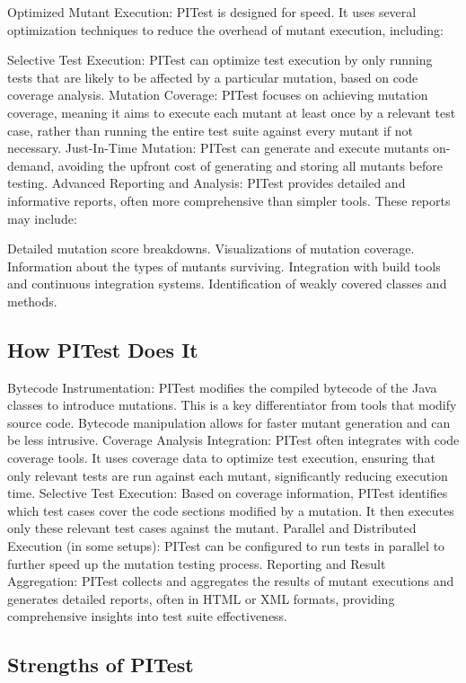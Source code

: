 \documentclass[sigplan, nonacm]{acmart}
\begin{document}
Optimized Mutant Execution: PITest is designed for speed. It uses several optimization techniques to reduce the overhead of mutant execution, including:

Selective Test Execution: PITest can optimize test execution by only running tests that are likely to be affected by a particular mutation, based on code coverage analysis.
Mutation Coverage: PITest focuses on achieving mutation coverage, meaning it aims to execute each mutant at least once by a relevant test case, rather than running the entire test suite against every mutant if not necessary.
Just-In-Time Mutation: PITest can generate and execute mutants on-demand, avoiding the upfront cost of generating and storing all mutants before testing.
Advanced Reporting and Analysis: PITest provides detailed and informative reports, often more comprehensive than simpler tools. These reports may include:

Detailed mutation score breakdowns.
Visualizations of mutation coverage.
Information about the types of mutants surviving.
Integration with build tools and continuous integration systems.
Identification of weakly covered classes and methods.
\subsection{How PITest Does It}

Bytecode Instrumentation: PITest modifies the compiled bytecode of the Java classes to introduce mutations. This is a key differentiator from tools that modify source code. Bytecode manipulation allows for faster mutant generation and can be less intrusive.
Coverage Analysis Integration: PITest often integrates with code coverage tools. It uses coverage data to optimize test execution, ensuring that only relevant tests are run against each mutant, significantly reducing execution time.
Selective Test Execution: Based on coverage information, PITest identifies which test cases cover the code sections modified by a mutation. It then executes only these relevant test cases against the mutant.
Parallel and Distributed Execution (in some setups): PITest can be configured to run tests in parallel to further speed up the mutation testing process.
Reporting and Result Aggregation: PITest collects and aggregates the results of mutant executions and generates detailed reports, often in HTML or XML formats, providing comprehensive insights into test suite effectiveness.
\subsection{Strengths of PITest}
\end{document}
